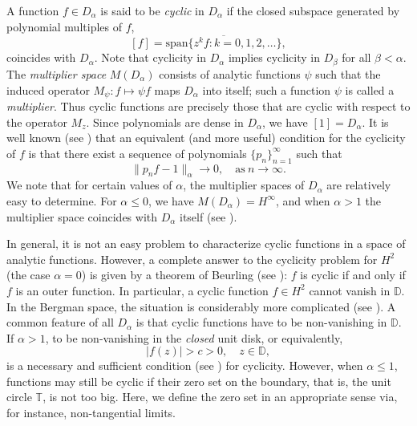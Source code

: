 \documentclass[11 pt,reqno]{amsart}
\theoremstyle{definition}
\theoremstyle{remark}
\numberwithin{equation}{section} \numberwithin{figure}{section}
\newcommand{\DD}{{\mathbb D}}
\newcommand{\TT}{{\mathbb T}}
\begin{document}
A function $f \in D_{\alpha}$ is said to be \emph{cyclic} in
$D_\alpha$ if the closed subspace generated by polynomial multiples
of $f$,
\[ [f]=\overline{\textrm{span}\{z^kf\colon k=0,1,2,\ldots\}},\]
coincides with $D_{\alpha}$. Note that cyclicity in
$D_\alpha$ implies cyclicity in $D_\beta$ for all $\beta < \alpha$.  The {\it multiplier space}
$M(D_{\alpha})$ consists of analytic functions $\psi$ such that
the induced operator $M_{\psi}\colon f\mapsto \psi f$ maps
$D_{\alpha}$ into itself; such a function $\psi$ is called a
\textit{multiplier}. Thus cyclic functions are precisely those that are
cyclic with respect to the operator $M_z$. Since polynomials
are dense in $D_\alpha$, we have $[1]=D_{\alpha}$. It
is well known (see \cite{BS84}) that an equivalent (and more useful)
condition for the cyclicity of $f$ is that there exist a sequence of
polynomials $\{p_n\}_{n=1}^{\infty}$ such that
\[\|p_n f-1\|_\alpha\rightarrow 0, \quad \textrm{as}\ n\rightarrow \infty.\]
We note that for certain values of $\alpha$, the multiplier
spaces of $D_{\alpha}$ are relatively easy to determine. For
$\alpha\leq 0$, we have $M(D_{\alpha})=H^{\infty}$, and when $\alpha>1$
the multiplier space coincides with $D_{\alpha}$ itself
(see \cite[p.~273]{BS84}).


In general, it is not an easy problem to characterize cyclic
functions in a space of analytic functions. However, a complete
answer to the cyclicity problem for $H^2$ (the case $\alpha=0$) is given by
a theorem of Beurling (see \cite[Chapter 7]{Durbook}): $f$ is cyclic
if and only if $f$ is an outer function. In particular, a cyclic
function $f\in H^2$ cannot vanish in $\DD$.  In the Bergman
space, the situation is considerably more complicated (see
\cite[Chapter 7]{HKZ00}). A common feature of all $D_{\alpha}$
is that cyclic functions have to be non-vanishing in $\DD$. If
$\alpha>1$, to be non-vanishing in the {\it closed}
unit disk, or equivalently,
\[|f(z)|>c>0, \quad z \in \DD,\]
is a necessary and sufficient condition (see \cite{BS84})
for cyclicity.  However,
when $\alpha\leq 1$, functions may still be cyclic if their zero set on the
boundary, that is, the unit circle $\TT$, is not too big. Here, we define the
zero set in an appropriate sense via, for instance, non-tangential limits.
\end{document}
